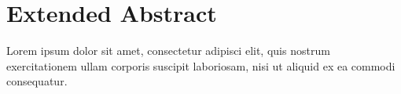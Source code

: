 \chapter*{Extended Abstract}
\label{cha:extended_abstract}

Lorem ipsum dolor sit amet, consectetur adipisci elit, quis nostrum exercitationem ullam corporis suscipit laboriosam, nisi ut aliquid ex ea commodi consequatur.